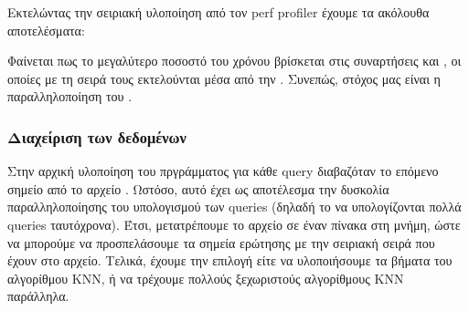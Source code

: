 \documentclass[11pt]{scrartcl} %
\begin{document}
Εκτελώντας την σειριακή υλοποίηση από τον perf profiler έχουμε τα ακόλουθα αποτελέσματα:



Φαίνεται πως το μεγαλύτερο ποσοστό του χρόνου βρίσκεται στις συναρτήσεις  και , οι οποίες με τη σειρά τους εκτελούνται 
μέσα από την . Συνεπώς, στόχος μας είναι η παραλληλοποίηση του .

\subsubsection{Διαχείριση των δεδομένων}

Στην αρχική υλοποίηση του πργράμματος για κάθε query διαβαζόταν το επόμενο σημείο από το αρχείο . 
Ωστόσο, αυτό έχει ως αποτέλεσμα την δυσκολία παραλληλοποίησης του υπολογισμού των queries (δηλαδή το να υπολογίζονται πολλά queries ταυτόχρονα).
Έτσι, μετατρέπουμε το αρχείο  σε έναν πίνακα στη μνήμη, ώστε να μπορούμε να προσπελάσουμε τα σημεία ερώτησης με την σειριακή σειρά που έχουν στο αρχείο.
Τελικά, έχουμε την επιλογή είτε να υλοποιήσουμε τα βήματα του αλγορίθμου KNN, ή να τρέχουμε πολλούς ξεχωριστούς αλγορίθμους KNN παράλληλα.
\end{document}

